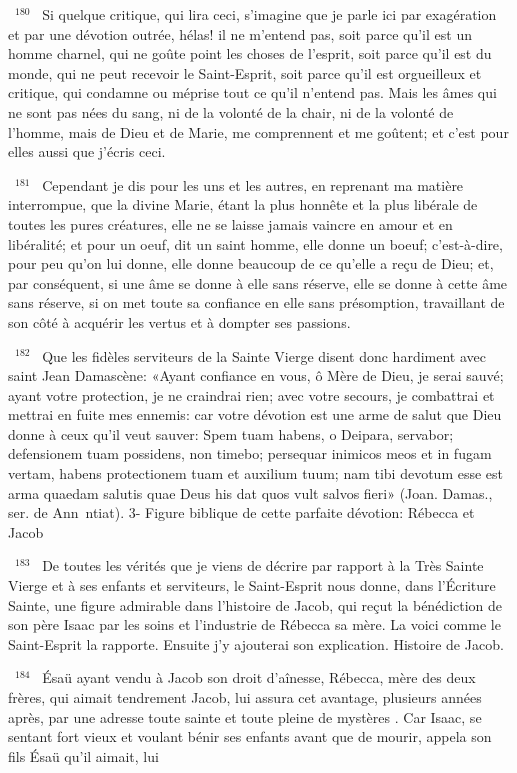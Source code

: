 \documentclass[paper=a5,pagesize=pdftex,fontsize=15pt,headinclude=on,twoside=off]{scrbook}
\newcommand{\negphantom}[1]{\settowidth{\dimen0}{#1}\hspace*{-\dimen0}}
\newcommand{\versenb}[1]{\par \vspace{10pt}~\negphantom{~${}^{#1}$~}${}^{#1}$~}
\begin{document}
\versenb{180} Si quelque critique, qui lira ceci, s'imagine que je parle ici par exagération et par une dévotion outrée, hélas! il
ne m'entend pas, soit parce qu'il est un homme charnel, qui ne goûte point les choses de l'esprit, soit parce qu'il
est du monde, qui ne peut recevoir le Saint-Esprit, soit parce qu'il est orgueilleux et critique, qui condamne ou
méprise tout ce qu'il n'entend pas. Mais les âmes qui ne sont pas nées du sang, ni de la volonté de la chair, ni de
la volonté de l'homme, mais de Dieu et de Marie, me comprennent et me goûtent; et c'est pour elles aussi que
j'écris ceci.
\versenb{181} Cependant je dis pour les uns et les autres, en reprenant ma matière interrompue, que la divine Marie, étant
la plus honnête et la plus libérale de toutes les pures créatures, elle ne se laisse jamais vaincre en amour et en
libéralité; et pour un oeuf, dit un saint homme, elle donne un boeuf; c'est-à-dire, pour peu qu'on lui donne, elle
donne beaucoup de ce qu'elle a reçu de Dieu; et, par conséquent, si une âme se donne à elle sans réserve, elle se
donne à cette âme sans réserve, si on met toute sa confiance en elle sans présomption, travaillant de son côté à
acquérir les vertus et à dompter ses passions.
\versenb{182} Que les fidèles serviteurs de la Sainte Vierge disent donc hardiment avec saint Jean Damascène: «Ayant
confiance en vous, ô Mère de Dieu, je serai sauvé; ayant votre protection, je ne craindrai rien; avec votre secours,
je combattrai et mettrai en fuite mes ennemis: car votre dévotion est une arme de salut que Dieu donne à ceux
qu'il veut sauver: Spem tuam habens, o Deipara, servabor; defensionem tuam possidens, non timebo; persequar
inimicos meos et in fugam vertam, habens protectionem tuam et auxilium tuum; nam tibi devotum esse est arma
quaedam salutis quae Deus his dat quos vult salvos fieri» (Joan. Damas., ser. de Ann~ntiat).
3- Figure biblique de cette parfaite dévotion: Rébecca et Jacob
\versenb{183} De toutes les vérités que je viens de décrire par rapport à la Très Sainte Vierge et à ses enfants et serviteurs,
le Saint-Esprit nous donne, dans l'Écriture Sainte, une figure admirable dans l'histoire de Jacob, qui reçut la
bénédiction de son père Isaac par les soins et l'industrie de Rébecca sa mère. La voici comme le Saint-Esprit la
rapporte. Ensuite j'y ajouterai son explication.
Histoire de Jacob.
\versenb{184} Ésaü ayant vendu à Jacob son droit d'aînesse, Rébecca, mère des deux frères, qui aimait tendrement Jacob,
lui assura cet avantage, plusieurs années après, par une adresse toute sainte et toute pleine de mystères . Car
Isaac, se sentant fort vieux et voulant bénir ses enfants avant que de mourir, appela son fils Ésaü qu'il aimait, lui
\end{document}
